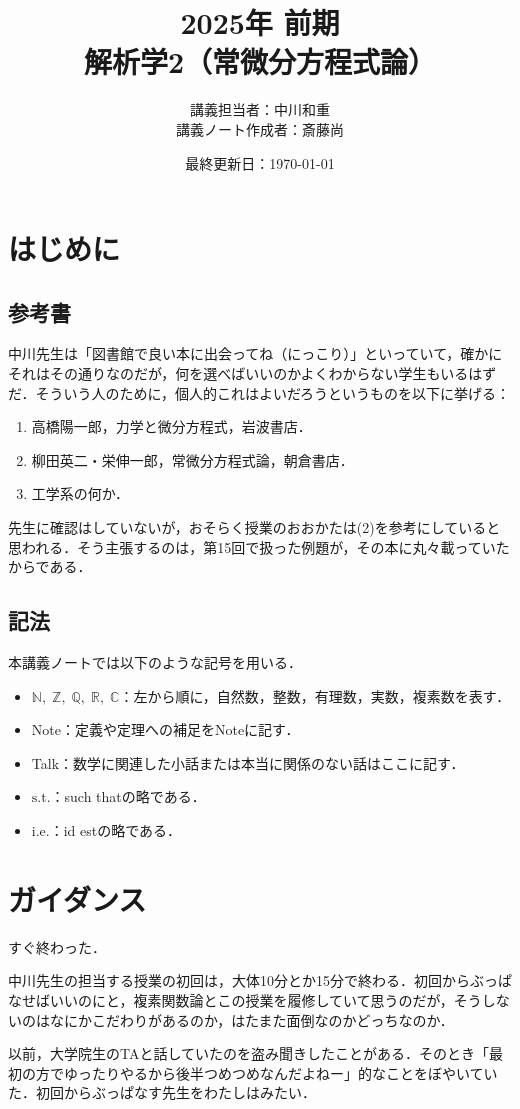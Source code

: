 \documentclass[dvipdfmx,a4,11pt]{jsarticle}
\title{{\Large 2025年 前期} \\ 解析学2（常微分方程式論）}
\author{講義担当者：中川和重 \\ 
講義ノート作成者：斎藤尚}
\date{最終更新日：\today}
\theoremstyle{definition}
\newtheorem*{mytalk*}{Talk}
\newenvironment{talk*}{\begin{leftbar}\begin{mytalk*}}{\end{mytalk*}\end{leftbar}}
\numberwithin{equation}{section}
\newcommand{\st}{\text{s.t.}} %
\newcommand{\ie}{\text{i.e.}}
\begin{document}
\maketitle
\tableofcontents

\clearpage

\section{はじめに}
\subsection{参考書}
中川先生は「図書館で良い本に出会ってね（にっこり）」といっていて，確かにそれはその通りなのだが，何を選べばいいのかよくわからない学生もいるはずだ．そういう人のために，個人的これはよいだろうというものを以下に挙げる：
\begin{enumerate}[label=\lbrack\arabic*\rbrack]
    \item 高橋陽一郎，力学と微分方程式，岩波書店．\label{book:takahashi}
    \item 柳田英二・栄伸一郎，常微分方程式論，朝倉書店．\label{book:yanagida}
    \item 工学系の何か．
\end{enumerate}
先生に確認はしていないが，おそらく授業のおおかたは(2)を参考にしていると思われる．そう主張するのは，第15回で扱った例題が，その本に丸々載っていたからである．

\subsection{記法}
本講義ノートでは以下のような記号を用いる．
\begin{itemize}
    \item $\mathbb{N},\; \mathbb{Z},\; \mathbb{Q},\; \mathbb{R},\; \mathbb{C}$：左から順に，自然数，整数，有理数，実数，複素数を表す．
    \item Note：定義や定理への補足をNoteに記す．
    \item Talk：数学に関連した小話または本当に関係のない話はここに記す．
    \item $\st$：such thatの略である．
    \item $\ie$：id estの略である．
\end{itemize}


\clearpage
\section{ガイダンス} %
すぐ終わった．
\begin{talk*}[中川先生の授業って...]
    中川先生の担当する授業の初回は，大体10分とか15分で終わる．初回からぶっぱなせばいいのにと，複素関数論とこの授業を履修していて思うのだが，そうしないのはなにかこだわりがあるのか，はたまた面倒なのかどっちなのか．

    以前，大学院生のTAと話していたのを盗み聞きしたことがある．そのとき「最初の方でゆったりやるから後半つめつめなんだよねー」的なことをぼやいていた．初回からぶっぱなす先生をわたしはみたい．
\end{talk*}
\end{document}
